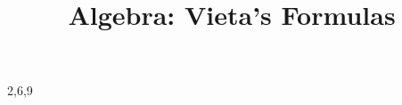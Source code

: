\documentclass[a4paper,12pt]{article}
\begin{document}

\title{Algebra: Vieta's Formulas}
\newcommand\event{S.3,4 Elite Mathematics Training}
\newcommand\learningobjective{
\item Learn The properties of quandratic equations
\item Learn Vieta's Formulas and its usage
}

\myfrontpage





\begin{question}[]{2,6,9}
    
    
    
    
    
    
    
    
    
    
    
    
\end{question}
\end{document}
